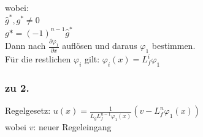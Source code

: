 \documentclass[german]{latex4ei/latex4ei_sheet}
\begin{document}
\begin{sectionbox}
wobei:\\
$\hat{g}^*, g^* \neq 0$ \\
$g* = (-1)^{n-1} \hat{g}^*$\\

Dann nach $\frac{\partial \varphi_1}{\partial x}$ auflösen und daraus $\varphi_1$ bestimmen. \\
Für die restlichen $\varphi_i$ gilt: $\varphi_i(x) = L_f^i \varphi_1$

\subsubsection{zu 2.}
Regelgesetz: $u(x) = \frac{1}{L_g L_f^{n-1} \varphi_1(x)} \left( v - L_f^n \varphi_1(x) \right)$\\
wobei $v$: neuer Regeleingang
\end{sectionbox}
\end{document}
